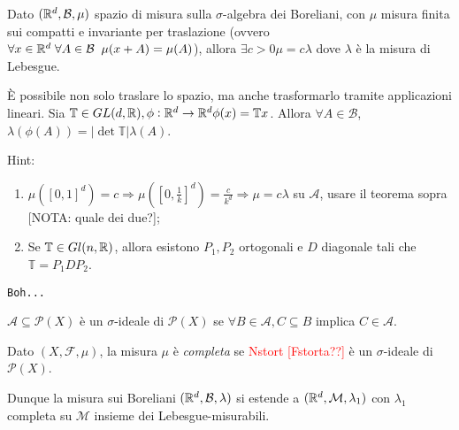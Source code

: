  
\begin{exercise}
	Dato $(\mathbb{R}^d, \mathcal{B}, \mu)$ spazio di misura sulla $\sigma$-algebra dei Boreliani, con $\mu$ misura finita sui compatti e invariante per traslazione (ovvero $\forall x \in \mathbb{R}^d \; \forall A \in \mathcal{B} \; \; \mu(x+A)=\mu(A)$), allora $\exists c>0 \mu=c\lambda$ dove $\lambda$ è la misura di Lebesgue.
\end{exercise}
\begin{exercise}
	È possibile non solo traslare lo spazio, ma anche trasformarlo tramite applicazioni lineari. Sia $\mathbb{T}\in GL(d,\mathbb{R}), \phi:\mathbb{R}^d \rightarrow \mathbb{R}^d\phi(x)=\mathbb{T}x$. Allora $\forall A \in \mathcal{B}$, $\lambda(\phi(A))=|\det \mathbb{T} | \lambda(A)$.
	
	Hint:
	\begin{enumerate}
		\item $\mu([0,1]^d)=c\Rightarrow \mu([0, \frac{1}{k}]^d)=\frac{c}{k^d}\Rightarrow \mu=c\lambda$ su $\mathcal{A}$, usare il teorema sopra {\color{red}[NOTA: quale dei due?]};
		\item Se $\mathbb{T} \in Gl(n,\mathbb{R})$, allora esistono $P_1, P_2$ ortogonali e $D$ diagonale tali che $\mathbb{T}=P_1DP_2$.
	\end{enumerate}
\end{exercise}

\begin{thm}
	\texttt{Boh...}
\end{thm}

\begin{definition}
	$ \mathcal{A}\subseteq \mathscr{P}(X) $ è un $\sigma$-ideale di $ \mathscr{P}(X) $ se $ \forall B \in \mathcal{A}, C \subseteq B $ implica $ C\in\mathcal{A} $.
\end{definition}

\begin{definition}
	Dato $ (X,\mathcal{F},\mu) $, la misura $ \mu $ è \emph{completa} se \textcolor{red}{Nstort [Fstorta??]} è un $\sigma$-ideale di $\mathscr{P}(X)$.
\end{definition}
Dunque la misura sui Boreliani $(\mathbb{R}^d, \mathcal{B}, \lambda)$ si estende a $(\mathbb{R}^d, \mathcal{M}, \lambda_1)$ con $\lambda_1$ completa su \(\mathcal{M}\) insieme dei Lebesgue-misurabili.


